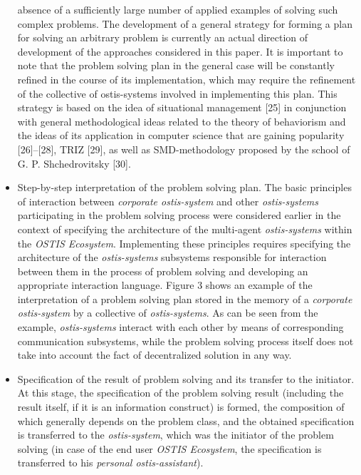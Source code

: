 \documentclass[9pt, letterpaper]{article}
\begin{document}
\begin{spacing}{0.97}
\begin{multicols}
\begin{itemize}
absence of a sufficiently large number of applied
examples of solving such complex problems.
The development of a general strategy for forming a
plan for solving an arbitrary problem is currently an
actual direction of development of the approaches
considered in this paper. It is important to note
that the problem solving plan in the general case
will be constantly refined in the course of its implementation, which may require the refinement of the
collective of ostis-systems involved in implementing
this plan. This strategy is based on the idea of
situational management [25] in conjunction with
general methodological ideas related to the theory of
behaviorism and the ideas of its application in computer science that are gaining popularity [26]–[28],
TRIZ [29], as well as SMD-methodology proposed
by the school of G. P. Shchedrovitsky [30].
    \item Step-by-step interpretation of the problem solving plan. The basic principles of interaction between \textit{corporate ostis-system} and other \textit{ostis-systems}
participating in the problem solving process were
considered earlier in the context of specifying the
architecture of the multi-agent \textit{ostis-systems} within
the \textit{OSTIS Ecosystem}. Implementing these principles requires specifying the architecture of the \textit{ostis-systems} subsystems responsible for interaction between them in the process of problem solving and
developing an appropriate interaction language.
Figure 3 shows an example of the interpretation
of a problem solving plan stored in the memory
of a \textit{corporate ostis-system} by a collective of \textit{ostis-systems}. As can be seen from the example, \textit{ostis-systems} interact with each other by means of corresponding communication subsystems, while the
problem solving process itself does not take into
account the fact of decentralized solution in any
way.
    \item Specification of the result of problem solving and
its transfer to the initiator. At this stage, the specification of the problem solving result (including
the result itself, if it is an information construct) is
formed, the composition of which generally depends
on the problem class, and the obtained specification
is transferred to the \textit{ostis-system}, which was the initiator of the problem solving (in case of the end user
\textit{OSTIS Ecosystem}, the specification is transferred to
his \textit{personal ostis-assistant}).
\end{itemize}


\end{multicols}
\end{spacing}
\end{document}
